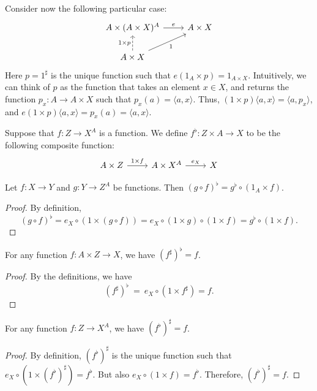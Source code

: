 Consider now the following particular case:
\[ \begin{tikzcd}
    A\times (A\times X)^A \arrow{r}{e} & A\times X  \\
    A\times  X \arrow[dashed]{u}{1\times p}
    \arrow[ur,"1"']
  \end{tikzcd} \] Here $p=1^\sharp$ is the unique function such that
  $e(1_A\times p)=1_{A\times X}$.  Intuitively, we can think of $p$ as
  the function that takes an element $x\in X$, and returns the
  function $p_x:A\to A\times X$ such that $p_x(a)=\langle a,x\rangle$.
  Thus, $(1\times p)\langle a,x\rangle=\langle a,p_x\rangle$, and
  $e(1\times p)\langle a,x\rangle =p_x(a)=\langle a,x\rangle$.


\begin{defn} Suppose that $f:Z\to X^A$ is a function.  We define
  $f^\flat :Z\times A\to X$ to be the following composite function:
\[ \begin{tikzcd}
A\times Z \arrow[r,"1\times f"] & A\times X^A \arrow[r,"e_X"] &
X \end{tikzcd} \] \end{defn}

\begin{prop} Let $f:X\to Y$ and $g:Y\to Z^A$ be functions.  Then
  $(g\circ f)^\flat = g^\flat \circ (1_A\times
  f)$.  \label{zuerst} \end{prop}

\begin{proof} By definition, 
\[ (g\circ f)^\flat = e_X\circ (1\times (g\circ f))=e_X\circ (1\times
g)\circ (1\times f)=g^\flat \circ (1\times f) .\]
\end{proof}




\begin{prop} For any function $f:A\times Z\to X$, we have $(f^\sharp
  )^\flat =f$. \end{prop}

\begin{proof} By the definitions, we have 
\[ (f^\sharp)^\flat \: = \: e_X\circ (1\times f^\sharp) = f .\]
\end{proof}

\begin{prop} For any function $f:Z\to X^A$, we have $(f^\flat )^\sharp
  = f$. \end{prop}

\begin{proof} By definition, $(f^\flat )^\sharp$ is the unique
  function such that $e_X\circ (1\times (f^\flat )^\sharp)=f^\flat$.
  But also $e_X\circ (1\times f)=f^\flat$.  Therefore,
  $(f^\flat)^\sharp=f$.
\end{proof}


